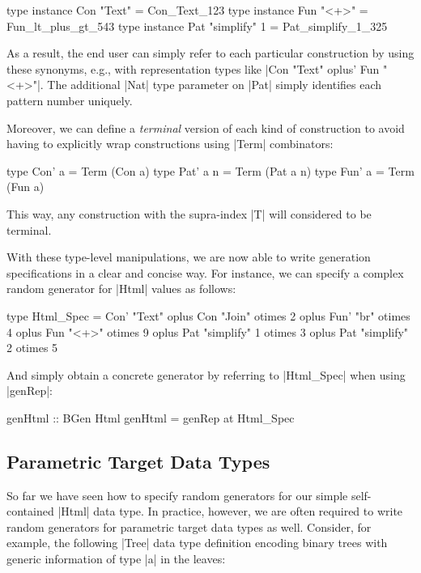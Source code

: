 \begin{code}
type instance Con "Text"        = Con_Text_123
type instance Fun "<+>"         = Fun_lt_plus_gt_543
type instance Pat "simplify" 1  = Pat_simplify_1_325
\end{code}
%
As a result, the end user can simply refer to each particular construction by
using these synonyms, e.g., with representation types like |Con "Text" oplus'
Fun "<+>"|.
%
The additional |Nat| type parameter on |Pat| simply identifies each pattern
number uniquely.


Moreover, we can define a \emph{terminal} version of each kind of construction
to avoid having to explicitly wrap constructions using |Term| combinators:

\begin{code}
type Con' a    = Term  (Con a)
type Pat' a n  = Term  (Pat a n)
type Fun' a    = Term  (Fun a)
\end{code}
%
This way, any construction with the supra-index |T| will considered to be
terminal.


With these type-level manipulations, we are now able to write generation
specifications in a clear and concise way.
%
For instance, we can specify a complex random generator for |Html| values as
follows:

\begin{code}
type Html_Spec
  =      Con'  "Text"
  oplus  Con   "Join"         otimes 2
  oplus  Fun'  "br"           otimes 4
  oplus  Fun   "<+>"          otimes 9
  oplus  Pat   "simplify"  1  otimes 3
  oplus  Pat   "simplify"  2  otimes 5
\end{code}

And simply obtain a concrete generator by referring to |Html_Spec| when using
|genRep|:

\begin{code}
genHtml :: BGen Html
genHtml = genRep at Html_Spec
\end{code}


%
\subsection{Parametric Target Data Types }

So far we have seen how to specify random generators for our simple
self-contained |Html| data type.
%
In practice, however, we are often required to write random generators for
parametric target data types as well.
%
Consider, for example, the following |Tree| data type definition encoding binary
trees with generic information of type |a| in the leaves:

